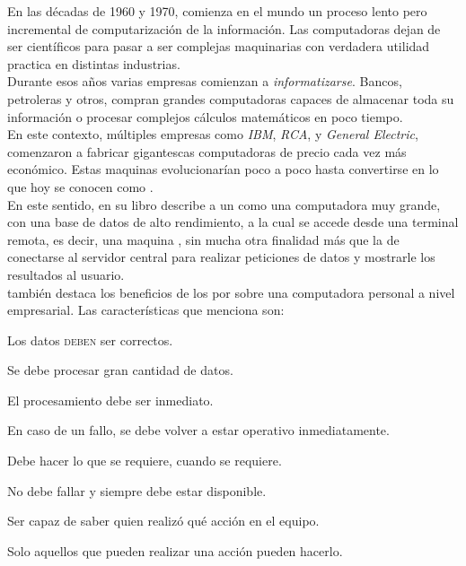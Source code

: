 En las décadas de 1960 y 1970, comienza en el mundo un proceso lento pero incremental de
computarización de la información. Las computadoras dejan de ser 
científicos para pasar a ser complejas maquinarias con verdadera utilidad practica
en distintas industrias.\\
Durante esos años varias empresas comienzan a \emph{informatizarse}. Bancos, petroleras
y otros, compran grandes computadoras capaces de almacenar toda su información o procesar
complejos cálculos matemáticos en poco tiempo.\\
En este contexto, múltiples empresas como \emph{IBM}, \emph{RCA}, y 
\emph{General Electric}, comenzaron a fabricar gigantescas computadoras de precio cada
vez más económico. Estas maquinas evolucionarían poco a poco hasta convertirse en lo que
hoy se conocen como \mainframes.\\
En este sentido,  en su libro
  describe a un \mainframe
como una computadora muy grande, con una base de datos de alto rendimiento, a la cual se
accede desde una terminal remota, es decir, una maquina , sin mucha otra
finalidad más que la de conectarse al servidor central para realizar peticiones de datos
y mostrarle los resultados al usuario.\\
\citeauthor{Stephens:2008:BOOK} también destaca los beneficios de los \mainframes por
sobre una computadora personal a nivel empresarial. Las características que menciona son:
\begin{description}[
	font=$\bullet$\enskip,
	leftmargin={\parindent*4},
	labelindent=\parindent]
	\setlength{\itemsep}{1pt}
	\setlength{\parskip}{0pt}
	\setlength{\parsep}{0pt}
	\item[Integridad de datos:] Los datos \textsc{deben} ser correctos.
	\item[Rendimiento:] Se debe procesar gran cantidad de datos.
	\item[Respuesta:] El procesamiento debe ser inmediato.
	\item[Recuperación ante desastres:] En caso de un fallo, se debe volver a estar
	operativo inmediatamente.
	\item[Usabilidad:] Debe hacer lo que se requiere, cuando se requiere.
	\item[Confiabilidad:] No debe fallar y siempre debe estar disponible.
	\item[Auditoria:] Ser capaz de saber quien realizó qué acción en el equipo.
	\item[Seguridad:] Solo aquellos que pueden realizar una acción pueden hacerlo.
\end{description}
